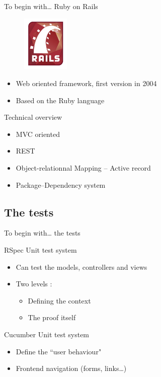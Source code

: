 \documentclass[10pt,a4paper]{beamer}
\begin{document}
\begin{frame}{To begin with… Ruby on Rails}
  \begin{figure}[htp]
  \centering
  \includegraphics[width=0.2\textwidth]{../img/logo_rails.png}
  \end{figure}

  \begin{itemize}
    \item Web oriented framework, first version in 2004
    \item Based on the Ruby language
  \end{itemize}

  \begin{block}{Technical overview}
    \begin{itemize}
      \item MVC oriented
      \item REST
      \item Object-relationnal Mapping -- Active record
      \item Package--Dependency system
    \end{itemize}
  \end{block}
\end{frame}

\subsection{The tests}

\begin{frame}{To begin with… the tests}

  \begin{block}{RSpec}
  	Unit test system
    \begin{itemize}
      \item Can test the models, controllers and views
      \item Two levels : 
		\begin{itemize}
		  \item Defining the context
		  \item The proof itself
		\end{itemize}
    \end{itemize}
  \end{block}
  
  \begin{block}{Cucumber}
  	Unit test system
    \begin{itemize}
      \item Define the ``user behaviour"
      \item Frontend navigation (forms, links…)
    \end{itemize}
  \end{block}
\end{frame}
\end{document}
